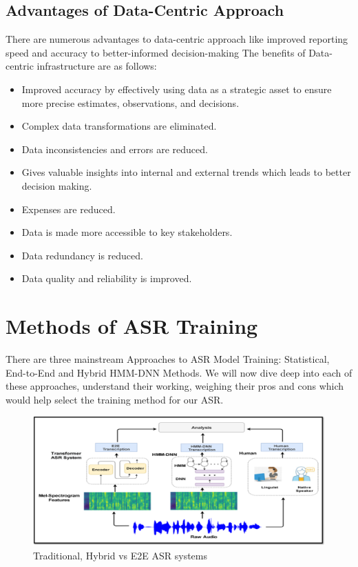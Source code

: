\subsection{Advantages of Data-Centric Approach}
There are numerous advantages to data-centric approach like improved reporting speed and accuracy to better-informed decision-making The benefits of Data-centric infrastructure are as follows:
\begin{itemize}
    \item Improved accuracy by effectively using data as a strategic asset to ensure more precise estimates, observations, and decisions.
    \item Complex data transformations are eliminated.
    \item Data inconsistencies and errors are reduced.
    \item Gives valuable insights into internal and external trends which leads to better decision making.
    \item Expenses are reduced.
    \item Data is made more accessible to key stakeholders.
    \item Data redundancy is reduced.
    \item Data quality and reliability is improved.
\end{itemize}

\section{Methods of ASR Training} 
\label{sec:approaches-asr-trg} 

There are three mainstream Approaches to ASR Model Training: Statistical, End-to-End and Hybrid HMM-DNN Methods. We will now dive deep into each of these approaches, understand their working, weighing their pros and cons which would help select the training method for our ASR.

\begin{figure}[h!]
    \centering
    \includegraphics[scale=0.45]{img/ASR-diagram-comparison.png}
    \caption{Traditional, Hybrid vs E2E ASR systems \cite{alsayadi_arabic_2021}}
    \label{fig:Traditional-vs-e2e}
\end{figure}

